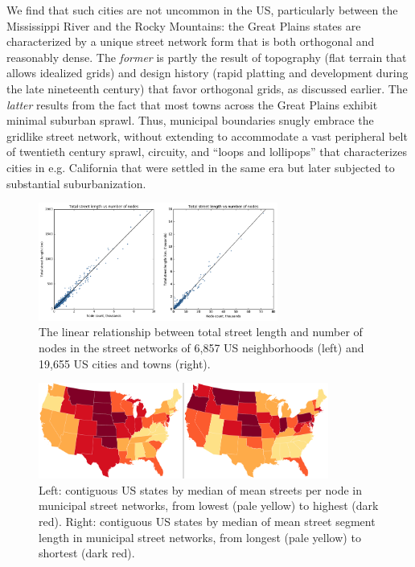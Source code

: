 \documentclass[Afour,sageh,times]{sagej}
\renewcommand{\cite}{\citep}
\begin{document}
We find that such cities are not uncommon in the US, particularly between the Mississippi River and the Rocky Mountains: the Great Plains states are characterized by a unique street network form that is both orthogonal and reasonably dense. The \emph{former} is partly the result of topography (flat terrain that allows idealized grids) and design history (rapid platting and development during the late nineteenth century) that favor orthogonal grids, as discussed earlier. The \emph{latter} results from the fact that most towns across the Great Plains exhibit minimal suburban sprawl. Thus, municipal boundaries snugly embrace the gridlike street network, without extending to accommodate a vast peripheral belt of twentieth century sprawl, circuity, and \enquote{loops and lollipops} \cite{southworth_streets_1997} that characterizes cities in e.g. California that were settled in the same era but later subjected to substantial suburbanization.

\begin{figure}
	\includegraphics[width=0.7\textwidth]{fig03.png}
	\caption{The linear relationship between total street length and number of nodes in the street networks of 6,857 US neighborhoods (left) and 19,655 US cities and towns (right).}
	\label{fig03}
\end{figure}

\begin{figure}
	\includegraphics[width=0.85\textwidth]{fig04.png}
	\caption{Left: contiguous US states by median of mean streets per node in municipal street networks, from lowest (pale yellow) to highest (dark red). Right: contiguous US states by median of mean street segment length in municipal street networks, from longest (pale yellow) to shortest (dark red).}
	\label{fig04}
\end{figure}
\end{document}
